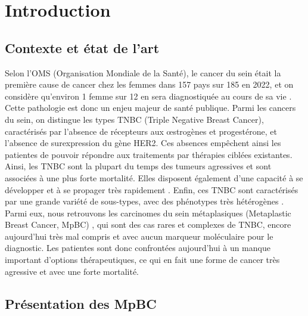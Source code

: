 \documentclass[11pt]{article}
\begin{document}
\newpage




\section{Introduction}

\subsection{Contexte et état de l’art}

Selon l’OMS (Organisation Mondiale de la Santé), le cancer du sein était la première cause de cancer chez les femmes dans 157 pays sur 185 \cite{WHO1} en 2022, et on considère qu’environ 1 femme sur 12 en sera diagnostiquée au cours de sa vie \cite{WHO1}. Cette pathologie est donc un enjeu majeur de santé publique. Parmi les cancers du sein, on distingue les types TNBC (Triple Negative Breast Cancer), caractérisés par l’absence de récepteurs aux œstrogènes et progestérone, et l’absence de surexpression du gène HER2. Ces absences empêchent ainsi les patientes de pouvoir répondre aux traitements par thérapies ciblées existantes. Ainsi, les TNBC sont la plupart du temps des tumeurs agressives et sont associées à une plus forte mortalité. Elles disposent également d’une capacité à se développer et à se propager très rapidement \cite{ACS_TNBC} \cite{Bianchini2016}. Enfin, ces TNBC sont caractérisés par une grande variété de sous-types, avec des phénotypes très hétérogènes \cite{Coutant2023}. Parmi eux, nous retrouvons les carcinomes du sein métaplasiques (Metaplastic Breast Cancer, MpBC) \cite{cancer.CA}, qui sont des cas rares et complexes de TNBC, encore aujourd’hui très mal compris et avec aucun marqueur moléculaire pour le diagnostic. Les patientes sont donc confrontées aujourd’hui à un manque important d’options thérapeutiques, ce qui en fait une forme de cancer très agressive et avec une forte mortalité.

\subsection{Présentation des MpBC}
\end{document}

